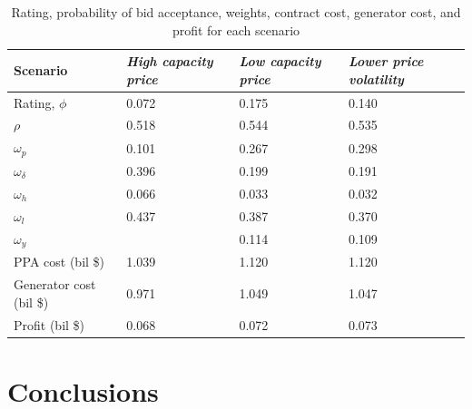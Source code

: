 \documentclass[informs]{informs3}
\begin{document}
\begin{table}[tableResults]
\caption {Rating, probability of bid acceptance, weights, contract cost, generator cost, and profit for each scenario} \label{tableResults}
\begin{tabular}{@{}llll@{}}
\toprule
Scenario                & \textit{High capacity price} & \textit{Low capacity price} & \textit{Lower price volatility} \\ \midrule
Rating, $\phi$          & 0.072                          & 0.175                         & 0.140                             \\
$\rho$                  & 0.518                          & 0.544                         & 0.535                             \\
$\omega_p$              & 0.101                          & 0.267                         & 0.298                             \\
$\omega_{\delta}$       & 0.396                          & 0.199                         & 0.191                             \\
$\omega_h$              & 0.066                          & 0.033                         & 0.032                             \\
$\omega_l$              & 0.437                          & 0.387                         & 0.370                             \\
$\omega_y$              &                                & 0.114                         & 0.109                             \\
PPA cost (bil \$)       & 1.039                          & 1.120                         & 1.120                             \\
Generator cost (bil \$) & 0.971                          & 1.049                         & 1.047                             \\
Profit (bil \$)         & 0.068                          & 0.072                         & 0.073                             \\ \bottomrule
\end{tabular}
\end{table}




\section{Conclusions}\label{Conclusions}


\end{document}
